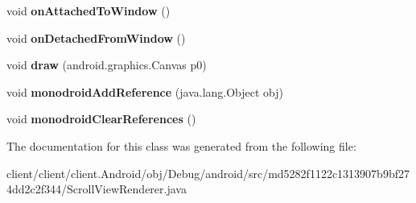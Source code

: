 \begin{DoxyCompactItemize}
\item 
\hypertarget{classmd5282f1122c1313907b9bf274dd2c2f344_1_1ScrollViewRenderer_a8a2e6466f948d8048de71dbbaf30e930}{}void {\bfseries on\+Attached\+To\+Window} ()\label{classmd5282f1122c1313907b9bf274dd2c2f344_1_1ScrollViewRenderer_a8a2e6466f948d8048de71dbbaf30e930}

\item 
\hypertarget{classmd5282f1122c1313907b9bf274dd2c2f344_1_1ScrollViewRenderer_a385fe026fef2de761880c215a60e4305}{}void {\bfseries on\+Detached\+From\+Window} ()\label{classmd5282f1122c1313907b9bf274dd2c2f344_1_1ScrollViewRenderer_a385fe026fef2de761880c215a60e4305}

\item 
\hypertarget{classmd5282f1122c1313907b9bf274dd2c2f344_1_1ScrollViewRenderer_a48cf4b41b370efc8d5ebc86378bcdc02}{}void {\bfseries draw} (android.\+graphics.\+Canvas p0)\label{classmd5282f1122c1313907b9bf274dd2c2f344_1_1ScrollViewRenderer_a48cf4b41b370efc8d5ebc86378bcdc02}

\item 
\hypertarget{classmd5282f1122c1313907b9bf274dd2c2f344_1_1ScrollViewRenderer_a3c280ad9ccccce3feeefcd6a4884a2e7}{}void {\bfseries monodroid\+Add\+Reference} (java.\+lang.\+Object obj)\label{classmd5282f1122c1313907b9bf274dd2c2f344_1_1ScrollViewRenderer_a3c280ad9ccccce3feeefcd6a4884a2e7}

\item 
\hypertarget{classmd5282f1122c1313907b9bf274dd2c2f344_1_1ScrollViewRenderer_af587db03e86380f8e0b7254f434cd866}{}void {\bfseries monodroid\+Clear\+References} ()\label{classmd5282f1122c1313907b9bf274dd2c2f344_1_1ScrollViewRenderer_af587db03e86380f8e0b7254f434cd866}

\end{DoxyCompactItemize}


The documentation for this class was generated from the following file\+:\begin{DoxyCompactItemize}
\item 
client/client/client.\+Android/obj/\+Debug/android/src/md5282f1122c1313907b9bf274dd2c2f344/Scroll\+View\+Renderer.\+java\end{DoxyCompactItemize}
